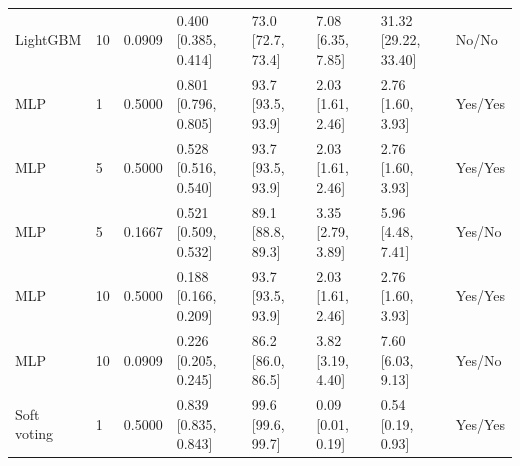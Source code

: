 \begin{longtable}{llllllll}
LightGBM & 10 & 0.0909 & \shortstack{{0.400} \\ {[0.385, 0.414]}} & \shortstack{{73.0} \\ {[72.7, 73.4]}} & \shortstack{{7.08} \\ {[6.35, 7.85]}} & \shortstack{{31.32} \\ {[29.22, 33.40]}} & No/No \\
MLP & 1 & 0.5000 & \shortstack{{0.801} \\ {[0.796, 0.805]}} & \shortstack{{93.7} \\ {[93.5, 93.9]}} & \shortstack{{2.03} \\ {[1.61, 2.46]}} & \shortstack{{2.76} \\ {[1.60, 3.93]}} & Yes/Yes \\
MLP & 5 & 0.5000 & \shortstack{{0.528} \\ {[0.516, 0.540]}} & \shortstack{{93.7} \\ {[93.5, 93.9]}} & \shortstack{{2.03} \\ {[1.61, 2.46]}} & \shortstack{{2.76} \\ {[1.60, 3.93]}} & Yes/Yes \\
MLP & 5 & 0.1667 & \shortstack{{0.521} \\ {[0.509, 0.532]}} & \shortstack{{89.1} \\ {[88.8, 89.3]}} & \shortstack{{3.35} \\ {[2.79, 3.89]}} & \shortstack{{5.96} \\ {[4.48, 7.41]}} & Yes/No \\
MLP & 10 & 0.5000 & \shortstack{{0.188} \\ {[0.166, 0.209]}} & \shortstack{{93.7} \\ {[93.5, 93.9]}} & \shortstack{{2.03} \\ {[1.61, 2.46]}} & \shortstack{{2.76} \\ {[1.60, 3.93]}} & Yes/Yes \\
MLP & 10 & 0.0909 & \shortstack{{0.226} \\ {[0.205, 0.245]}} & \shortstack{{86.2} \\ {[86.0, 86.5]}} & \shortstack{{3.82} \\ {[3.19, 4.40]}} & \shortstack{{7.60} \\ {[6.03, 9.13]}} & Yes/No \\
Soft voting & 1 & 0.5000 & \shortstack{{0.839} \\ {[0.835, 0.843]}} & \shortstack{{99.6} \\ {[99.6, 99.7]}} & \shortstack{{0.09} \\ {[0.01, 0.19]}} & \shortstack{{0.54} \\ {[0.19, 0.93]}} & Yes/Yes \\

\end{longtable}
